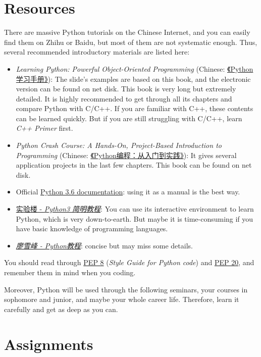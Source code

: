 \documentclass[english]{../TexTemplate/thesis}
\begin{document}
\section{Resources}
There are massive Python tutorials on the Chinese Internet, and you can easily find them on Zhihu or Baidu, but most of them are not systematic enough.
Thus, several recommended introductory materials are listed here:
\begin{itemize}
	\item \emph{Learning Python: Powerful Object-Oriented Programming} (Chinese: \href{https://item.jd.com/12452929.html}{《Python学习手册》}): The slide's examples are based on this book, and the electronic version can be found on net disk. This book is very long but extremely detailed. It is highly recommended to get through all its chapters and compare Python with C/C++. If you are familiar with C++, these contents can be learned quickly. But if you are still struggling with C/C++, learn \emph{C++ Primer} first.
	\item \emph{Python Crash Course: A Hands-On, Project-Based Introduction to Programming} (Chinese: \href{https://item.jd.com/11993134.html}{《Python编程：从入门到实践》}): It gives several application projects in the last few chapters. This book can be found on net disk.
	\item Official \href{https://docs.python.org/3.6/}{Python 3.6 documentation}: using it as a manual is the best way.
	\item \href{https://www.shiyanlou.com/courses/596}{实验楼 - \emph{Python3 简明教程}}: You can use its interactive environment to learn Python, which is very down-to-earth. But maybe it is time-consuming if you have basic knowledge of programming languages.
	\item \emph{\href{https://www.liaoxuefeng.com/wiki/1016959663602400}{廖雪峰 - Python教程}}: concise but may miss some details.
\end{itemize}

You should read through \href{https://www.python.org/dev/peps/pep-0008/}{PEP 8} (\emph{Style Guide for Python code}) and \href{https://www.python.org/dev/peps/pep-0020/}{PEP 20}, and remember them in mind when you coding.

Moreover, Python will be used through the following seminars, your courses in sophomore and junior, and maybe your whole career life.
Therefore, learn it carefully and get as deep as you can.

\newpage
\section{Assignments}
\end{document}
